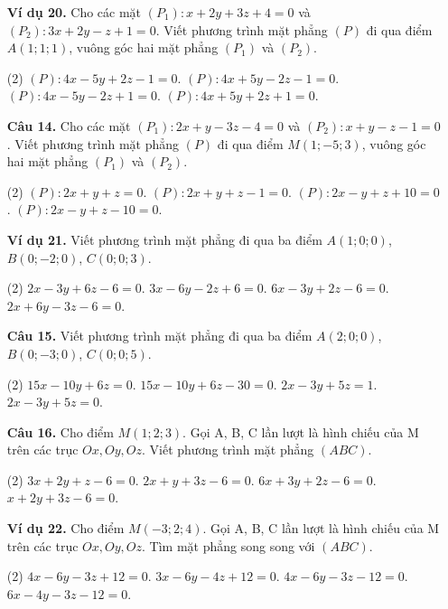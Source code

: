 \documentclass[12pt, a4paper]{article}
\begin{document}
\begin{enumerate}[label=\textbf{\arabic*.}, wide=0pt, leftmargin=*]
    
    \item[\textbf{Ví dụ 20.}] Cho các mặt \((P_1): x+2y+3z+4=0\) và \((P_2): 3x+2y-z+1=0\). Viết phương trình mặt phẳng \((P)\) đi qua điểm \(A(1;1;1)\), vuông góc hai mặt phẳng \((P_1)\) và \((P_2)\).
    \begin{tasks}(2)
        \task \((P): 4x-5y+2z-1=0\).
        \task \((P): 4x+5y-2z-1=0\).
        \task \((P): 4x-5y-2z+1=0\).
        \task \((P): 4x+5y+2z+1=0\).
    \end{tasks}
    
    \item[\textbf{Câu 14.}] Cho các mặt \((P_1): 2x+y-3z-4=0\) và \((P_2): x+y-z-1=0\). Viết phương trình mặt phẳng \((P)\) đi qua điểm \(M(1;-5;3)\), vuông góc hai mặt phẳng \((P_1)\) và \((P_2)\).
    \begin{tasks}(2)
        \task \((P): 2x+y+z=0\).
        \task \((P): 2x+y+z-1=0\).
        \task \((P): 2x-y+z+10=0\).
        \task \((P): 2x-y+z-10=0\).
    \end{tasks}
    
    \item[\textbf{Ví dụ 21.}] Viết phương trình mặt phẳng đi qua ba điểm \(A(1;0;0)\), \(B(0;-2;0)\), \(C(0;0;3)\).
    \begin{tasks}(2)
        \task \(2x-3y+6z-6=0\).
        \task \(3x-6y-2z+6=0\).
        \task \(6x-3y+2z-6=0\).
        \task \(2x+6y-3z-6=0\).
    \end{tasks}
    
    \item[\textbf{Câu 15.}] Viết phương trình mặt phẳng đi qua ba điểm \(A(2;0;0)\), \(B(0;-3;0)\), \(C(0;0;5)\).
    \begin{tasks}(2)
        \task \(15x-10y+6z=0\).
        \task \(15x-10y+6z-30=0\).
        \task \(2x-3y+5z=1\).
        \task \(2x-3y+5z=0\).
    \end{tasks}
    
    \item[\textbf{Câu 16.}] Cho điểm \(M(1;2;3)\). Gọi A, B, C lần lượt là hình chiếu của M trên các trục \(Ox, Oy, Oz\). Viết phương trình mặt phẳng \((ABC)\).
    \begin{tasks}(2)
        \task \(3x+2y+z-6=0\).
        \task \(2x+y+3z-6=0\).
        \task \(6x+3y+2z-6=0\).
        \task \(x+2y+3z-6=0\).
    \end{tasks}
    
    \item[\textbf{Ví dụ 22.}] Cho điểm \(M(-3;2;4)\). Gọi A, B, C lần lượt là hình chiếu của M trên các trục \(Ox, Oy, Oz\). Tìm mặt phẳng song song với \((ABC)\).
    \begin{tasks}(2)
        \task \(4x-6y-3z+12=0\).
        \task \(3x-6y-4z+12=0\).
        \task \(4x-6y-3z-12=0\).
        \task \(6x-4y-3z-12=0\).
    \end{tasks}
    

\end{enumerate}
\end{document}
